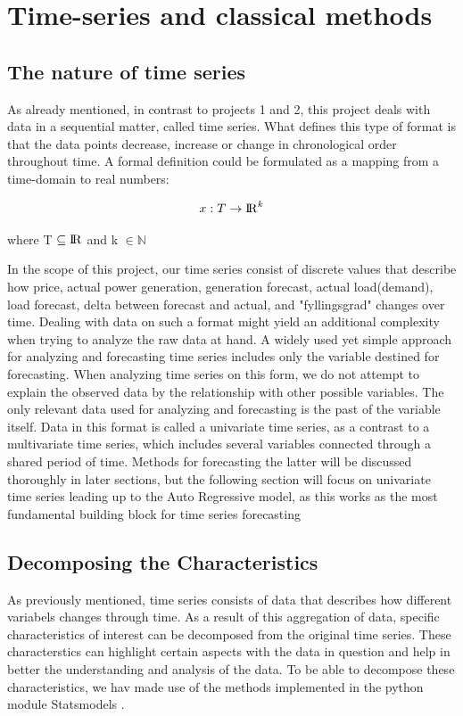\documentclass
[twocolumn,
secnumarabic,
nobibnotes,
aps,
prl,
reprint,
groupedaddress,
amsmath,
amssymb,
]{revtex4-2}
\begin{document}
\section{Time-series and classical methods}

\subsection{The nature of time series}
As already mentioned, in contrast to projects 1 and 2, this project deals with data in a sequential matter, called time series. What defines this type of format is that the data points decrease, increase or change in chronological order throughout time\cite{Vishwas2020}.  A formal definition could be formulated as a mapping from a time-domain to real numbers:

\begin{equation}
  x: T \rightarrow  {\rm I\!R}^k 
\end{equation}

where T $\subseteq {\rm I\!R}$ and k $\in \mathbb{N}$ \cite{Auffarth2021}

In the scope of this project, our time series consist of discrete values that describe how price, actual power generation, generation forecast, actual load(demand), load forecast, delta between forecast and actual, and "fyllingsgrad" changes over time. 
Dealing with data on such a format might yield an additional complexity when trying to analyze the raw data at hand. A widely used yet simple approach for analyzing and forecasting time series includes only the variable destined for forecasting.  When analyzing time series on this form, we do not attempt to explain the observed data by the relationship with other possible variables. The only relevant data used for analyzing and forecasting is the past of the variable itself. Data in this format is called a univariate time series, as a contrast to a multivariate time series, which includes several variables connected through a shared period of time. Methods for forecasting the latter will be discussed thoroughly in later sections, but the following section will focus on univariate time series leading up to the Auto Regressive model, as this works as the most fundamental building block for time series forecasting \cite{Korstanje2021} 

\subsection{Decomposing the Characteristics}
As previously mentioned, time series consists of data that describes how different variabels changes through time. As a result of this aggregation of data, specific characteristics of interest can be decomposed from the original time series. These characterstics can highlight certain aspects with the data in question and help in better the understanding and analysis of the data. To be able to decompose these characteristics, we hav made use of the methods implemented in the python module Statsmodels \cite{seabold2010statsmodels}. 
\end{document}
